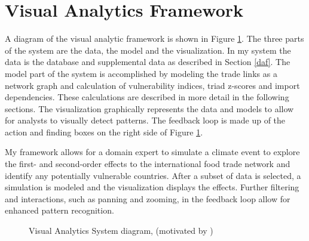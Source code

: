 	\section{Visual Analytics Framework}
		A diagram of the visual analytic framework is shown in Figure \ref{architecture}. The three parts of the system are the data, the model and the visualization. In my system the data is the database and supplemental data as described in Section \ref{daf}. The model part of the system is accomplished by modeling the trade links as a network graph and calculation of vulnerability indices, triad z-scores and import dependencies. These calculations are described in more detail in the following sections. The visualization graphically represents the data and models to allow for analysts to visually detect patterns. The feedback loop is made up of the action and finding boxes on the right side of Figure \ref{architecture}.\par
		My framework allows for a domain expert to simulate a climate event to explore the first- and second-order effects to the international food trade network and identify any potentially vulnerable countries. After a subset of data is selected, a simulation is modeled and the visualization displays the effects. Further filtering and interactions, such as panning and zooming, in the feedback loop allow for enhanced pattern recognition.\par
		\begin{figure}[htb]
			\caption[VISUAL ANALYTICS SYSTEM DIAGRAM]{Visual Analytics System diagram, (motivated by \cite{sacha2014knowledge})}
			\label{architecture}
		\end{figure}
